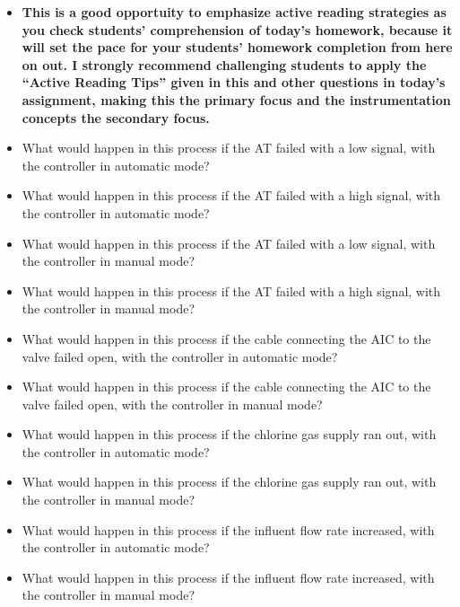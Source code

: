 \begin{itemize}
\item{} {\bf This is a good opportuity to emphasize active reading strategies as you check students' comprehension of today's homework, because it will set the pace for your students' homework completion from here on out.  I strongly recommend challenging students to apply the ``Active Reading Tips'' given in this and other questions in today's assignment, making this the primary focus and the instrumentation concepts the secondary focus.}
\item{} What would happen in this process if the AT failed with a low signal, with the controller in automatic mode?
\item{} What would happen in this process if the AT failed with a high signal, with the controller in automatic mode?
\item{} What would happen in this process if the AT failed with a low signal, with the controller in manual mode?
\item{} What would happen in this process if the AT failed with a high signal, with the controller in manual mode?
\item{} What would happen in this process if the cable connecting the AIC to the valve failed open, with the controller in automatic mode?
\item{} What would happen in this process if the cable connecting the AIC to the valve failed open, with the controller in manual mode?
\item{} What would happen in this process if the chlorine gas supply ran out, with the controller in automatic mode?
\item{} What would happen in this process if the chlorine gas supply ran out, with the controller in manual mode?
\item{} What would happen in this process if the influent flow rate increased, with the controller in automatic mode?
\item{} What would happen in this process if the influent flow rate increased, with the controller in manual mode?
\end{itemize}





